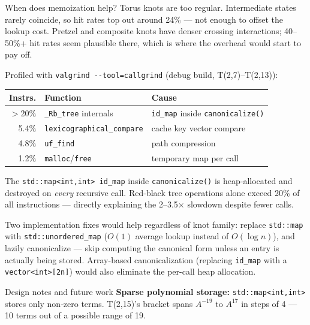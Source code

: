 \documentclass[final]{beamer}
\newlength{\colwidth}
\begin{document}
\begin{frame}[t,fragile]
\begin{columns}[t]
\begin{column}{\colwidth}
  \begin{block}{When does memoization help?}
    Torus knots are too regular. Intermediate states rarely coincide, so hit rates top out around 24\% --- not enough to offset the lookup cost. Pretzel and composite knots have denser crossing interactions; 40--50\%+ hit rates seem plausible there, which is where the overhead would start to pay off.

    \vspace{0.1cm}

    Profiled with \texttt{valgrind -{}-tool=callgrind} (debug build, T(2,7)--T(2,13)):

    \begin{center}
    \begin{tabular}{rll}
    \toprule
    \textbf{Instrs.} & \textbf{Function} & \textbf{Cause} \\
    \midrule
    $>$20\% & \texttt{\_Rb\_tree} internals & \texttt{id\_map} inside \texttt{canonicalize()} \\
    5.4\%   & \texttt{lexicographical\_compare} & cache key vector compare \\
    4.8\%   & \texttt{uf\_find} & path compression \\
    1.2\%   & \texttt{malloc}/\texttt{free} & temporary map per call \\
    \bottomrule
    \end{tabular}
    \end{center}

    \vspace{0.05cm}
    The \texttt{std::map<int,int> id\_map} inside \texttt{canonicalize()} is heap-allocated and destroyed on \emph{every} recursive call. Red-black tree operations alone exceed 20\% of all instructions --- directly explaining the 2--3.5$\times$ slowdown despite fewer calls.

    \vspace{0.1cm}
    Two implementation fixes would help regardless of knot family: replace \texttt{std::map} with \texttt{std::unordered\_map} ($O(1)$ average lookup instead of $O(\log n)$), and lazily canonicalize --- skip computing the canonical form unless an entry is actually being stored. Array-based canonicalization (replacing \texttt{id\_map} with a \texttt{vector<int>[2n]}) would also eliminate the per-call heap allocation.
  \end{block}

  \begin{block}{Design notes and future work}
    \textbf{Sparse polynomial storage:} \texttt{std::map<int,int>} stores only non-zero terms. T(2,15)'s bracket spans $A^{-19}$ to $A^{17}$ in steps of 4 --- 10 terms out of a possible range of 19.


\end{block}
\end{column}
\end{columns}
\end{frame}
\end{document}
